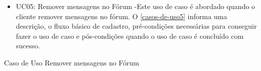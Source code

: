 \begin{itemize}
	\item UC05: Remover mensagens no Fórum -Este uso de caso é abordado quando o cliente remover mensagens no fórum. O 	\autoref{casos-de-uso5} informa uma descrição, o fluxo básico de cadastro, pré-condições necessárias para conseguir fazer o uso de caso e pós-condições quando o uso de caso é concluído com sucesso. \\
\end{itemize}


\begin{quadro}[htb]
	\centering
	\ABNTEXfontereduzida

	\caption[Caso de Uso Remover mensagens no Fórum]{Caso de Uso Remover mensagens no Fórum}
	\label{casos-de-uso5}
\end{quadro}

